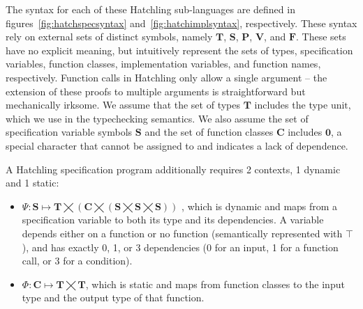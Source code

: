 The syntax for each of these Hatchling sub-languages are defined in figures~\ref{fig:hatchspecsyntax} and~\ref{fig:hatchimplsyntax}, respectively.  These syntax rely on external sets of distinct symbols, namely $\mathbf{T}$, $\textbf{S}$, $\textbf{P}$, $\mathbf{V}$, and $\mathbf{F}$.  These sets have no explicit meaning, but intuitively represent the sets of types, specification variables, function classes, implementation variables, and function names, respectively.  Function calls in Hatchling only allow a single argument -- the extension of these proofs to multiple arguments is straightforward but mechanically irksome.  We assume that the set of types $\mathbf{T}$ includes the type $\textrm{unit}$, which we use in the typechecking semantics.  We also assume the set of specification variable symbols $\mathbf{S}$ and the set of function classes $\mathbf{C}$ includes $\mathbf{0}$, a special character that cannot be assigned to and indicates a lack of dependence.

A Hatchling specification program additionally requires 2 contexts, 1 dynamic and 1 static:
\begin{itemize}
\item 
$\Psi:\mathbf{S}\mapsto
\mathbf{T}\bigtimes
\left(\mathbf{C}\bigtimes
\left(\mathbf{S}\bigtimes\mathbf{S}\bigtimes\mathbf{S}\right)
\right)$
, which is dynamic and maps from a specification variable to both its type and its dependencies.  A variable depends either on a function or no function (semantically represented with $\top$), and has exactly 0, 1, or 3 dependencies (0 for an input, 1 for a function call, or 3 for a condition).
\item $\Phi:\mathbf{C}\mapsto\mathbf{T}\bigtimes\mathbf{T}$, which is static and maps from function classes to the input type and the output type of that function.
\end{itemize}


